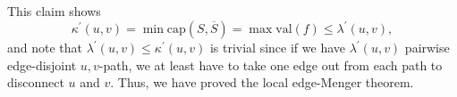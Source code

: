 This claim shows
\[
    \kappa ^{\prime} (u, v) = \min \mathrm{cap}(S, \overline{S}) = \max \mathrm{val} (f) \le \lambda ^{\prime} (u, v),  
\]
and note that \(\lambda ^{\prime} (u, v) \le \kappa ^{\prime} (u, v)\) is trivial since if we have \(\lambda ^{\prime} (u, v)\) pairwise edge-disjoint \(u, v\)-path, we at least have to take one edge out from each path to disconnect \(u\) and \(v\). Thus, we have proved the local edge-Menger theorem.     